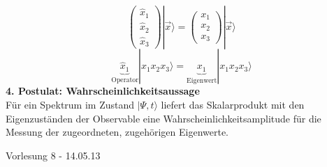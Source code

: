 \documentclass[10pt,article,colorback,accentcolor=tud9d]{scrartcl}
\begin{document}
    \begin{equation}
    \left(\begin{array}{c} \hat{x}_1 \\ \hat{x}_2 \\ \hat{x}_3 \end{array}\right)\left.\right|\vec{x}\rangle=\left(\begin{array}{c} x_1 \\ x_2 \\ x_3 \end{array}\right)\left.\right|\vec{x}\rangle
    \end{equation}
    \begin{equation}
    \underbrace{\hat{x}_1}_{\text{Operator}}\left.\right|x_1x_2x_3\rangle=\underbrace{x_1}_{\text{Eigenwert}}\left.\right|x_1x_2x_3\rangle
    \end{equation}
  \textbf{4. Postulat: Wahrscheinlichkeitsaussage}\\
    Für ein Spektrum im Zustand $\left.\right|\Psi,t\rangle$ liefert das Skalarprodukt mit den Eigenzuständen der Observable eine Wahrscheinlichkeitsamplitude für die Messung der zugeordneten, zugehörigen Eigenwerte.
    

\begin{flushright}
Vorlesung 8 - 14.05.13
\end{flushright}
 
\end{document}
